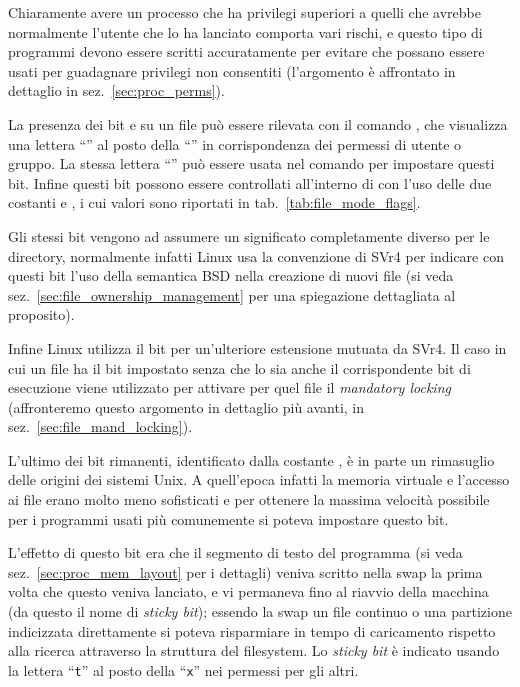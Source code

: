 Chiaramente avere un processo che ha privilegi superiori a quelli che avrebbe
normalmente l'utente che lo ha lanciato comporta vari rischi, e questo tipo di
programmi devono essere scritti accuratamente per evitare che possano essere
usati per guadagnare privilegi non consentiti (l'argomento è affrontato in
dettaglio in sez.~\ref{sec:proc_perms}).

La presenza dei bit  e  su un file può essere rilevata con
il comando , che visualizza una lettera ``'' al posto della
``'' in corrispondenza dei permessi di utente o gruppo. La stessa
lettera ``'' può essere usata nel comando  per impostare
questi bit.  Infine questi bit possono essere controllati all'interno di
 con l'uso delle due costanti  e
, i cui valori sono riportati in
tab.~\ref{tab:file_mode_flags}.

Gli stessi bit vengono ad assumere un significato completamente diverso per le
directory, normalmente infatti Linux usa la convenzione di SVr4 per indicare
con questi bit l'uso della semantica BSD nella creazione di nuovi file (si
veda sez.~\ref{sec:file_ownership_management} per una spiegazione dettagliata
al proposito).

Infine Linux utilizza il bit  per un'ulteriore estensione mutuata da
SVr4. Il caso in cui un file ha il bit  impostato senza che lo sia
anche il corrispondente bit di esecuzione viene utilizzato per attivare per
quel file il \textit{mandatory locking} (affronteremo questo argomento in
dettaglio più avanti, in sez.~\ref{sec:file_mand_locking}).



L'ultimo dei bit rimanenti, identificato dalla costante , è in
parte un rimasuglio delle origini dei sistemi Unix. A quell'epoca infatti la
memoria virtuale e l'accesso ai file erano molto meno sofisticati e per
ottenere la massima velocità possibile per i programmi usati più comunemente
si poteva impostare questo bit.

L'effetto di questo bit era che il segmento di testo del programma (si veda
sez.~\ref{sec:proc_mem_layout} per i dettagli) veniva scritto nella swap la
prima volta che questo veniva lanciato, e vi permaneva fino al riavvio della
macchina (da questo il nome di \textsl{sticky bit}); essendo la swap un file
continuo o una partizione indicizzata direttamente si poteva risparmiare in
tempo di caricamento rispetto alla ricerca attraverso la struttura del
filesystem. Lo \textsl{sticky bit} è indicato usando la lettera ``\texttt{t}''
al posto della ``\texttt{x}'' nei permessi per gli altri.

